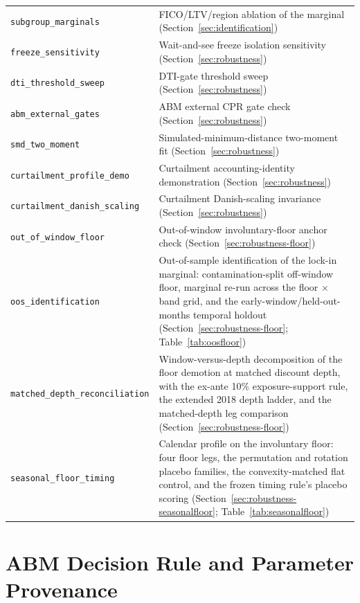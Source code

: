 \documentclass[12pt]{article}
\begin{document}
\begin{table}[H]
\begin{threeparttable}
\begin{tabular}{@{}p{5.4cm}p{8.8cm}@{}}
\texttt{subgroup\_marginals} & FICO/LTV/region ablation of the marginal (Section~\ref{sec:identification}) \\
\texttt{freeze\_sensitivity} & Wait-and-see freeze isolation sensitivity (Section~\ref{sec:robustness}) \\
\texttt{dti\_threshold\_sweep} & DTI-gate threshold sweep (Section~\ref{sec:robustness}) \\
\texttt{abm\_external\_gates} & ABM external CPR gate check (Section~\ref{sec:robustness}) \\
\texttt{smd\_two\_moment} & Simulated-minimum-distance two-moment fit (Section~\ref{sec:robustness}) \\
\texttt{curtailment\_profile\_demo} & Curtailment accounting-identity demonstration (Section~\ref{sec:robustness}) \\
\texttt{curtailment\_danish\_scaling} & Curtailment Danish-scaling invariance (Section~\ref{sec:robustness}) \\
\texttt{out\_of\_window\_floor} & Out-of-window involuntary-floor anchor check (Section~\ref{sec:robustness-floor}) \\
\texttt{oos\_identification} & Out-of-sample identification of the lock-in marginal: contamination-split off-window floor, marginal re-run across the floor $\times$ band grid, and the early-window/held-out-months temporal holdout (Section~\ref{sec:robustness-floor}; Table~\ref{tab:oosfloor}) \\
\texttt{matched\_depth\_reconciliation} & Window-versus-depth decomposition of the floor demotion at matched discount depth, with the ex-ante 10\% exposure-support rule, the extended 2018 depth ladder, and the matched-depth leg comparison (Section~\ref{sec:robustness-floor}) \\
\texttt{seasonal\_floor\_timing} & Calendar profile on the involuntary floor: four floor legs, the permutation and rotation placebo families, the convexity-matched flat control, and the frozen timing rule's placebo scoring (Section~\ref{sec:robustness-seasonalfloor}; Table~\ref{tab:seasonalfloor}) \\
\bottomrule
\end{tabular}
\end{threeparttable}
\end{table}

\section{ABM Decision Rule and Parameter Provenance}\label{app:abmspec}
\end{document}
